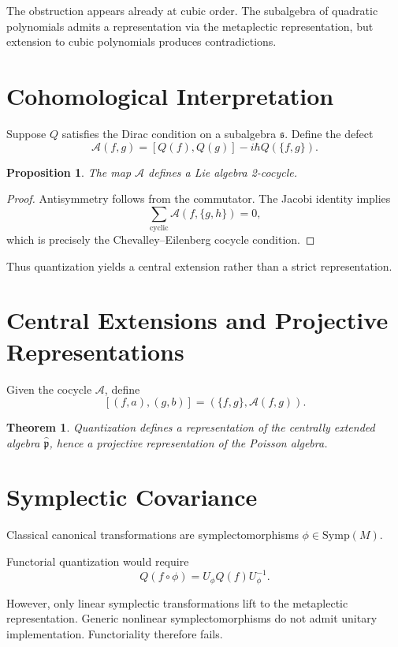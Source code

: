 \documentclass[11pt]{article}
\newtheorem{theorem}{Theorem}
\newtheorem{proposition}{Proposition}
\theoremstyle{definition}
\theoremstyle{remark}
\begin{document}
The obstruction appears already at cubic order. The subalgebra of quadratic polynomials admits a representation via the metaplectic representation, but extension to cubic polynomials produces contradictions.

\section{Cohomological Interpretation}

Suppose $Q$ satisfies the Dirac condition on a subalgebra $\mathfrak{s}$. Define the defect
\[
\mathcal{A}(f,g)
=
[Q(f),Q(g)] - i\hbar Q(\{f,g\}).
\]

\begin{proposition}
The map $\mathcal{A}$ defines a Lie algebra 2-cocycle.
\end{proposition}

\begin{proof}
Antisymmetry follows from the commutator. The Jacobi identity implies
\[
\sum_{\text{cyclic}} \mathcal{A}(f,\{g,h\}) = 0,
\]
which is precisely the Chevalley--Eilenberg cocycle condition.
\end{proof}

Thus quantization yields a central extension rather than a strict representation.

\section{Central Extensions and Projective Representations}

Given the cocycle $\mathcal{A}$, define
\[
[(f,a),(g,b)] = (\{f,g\}, \mathcal{A}(f,g)).
\]

\begin{theorem}
Quantization defines a representation of the centrally extended algebra $\widehat{\mathfrak{p}}$, hence a projective representation of the Poisson algebra.
\end{theorem}

\section{Symplectic Covariance}

Classical canonical transformations are symplectomorphisms $\phi \in \mathrm{Symp}(M)$.

Functorial quantization would require
\[
Q(f\circ \phi) = U_\phi Q(f) U_\phi^{-1}.
\]

However, only linear symplectic transformations lift to the metaplectic representation. Generic nonlinear symplectomorphisms do not admit unitary implementation. Functoriality therefore fails.
\end{document}

